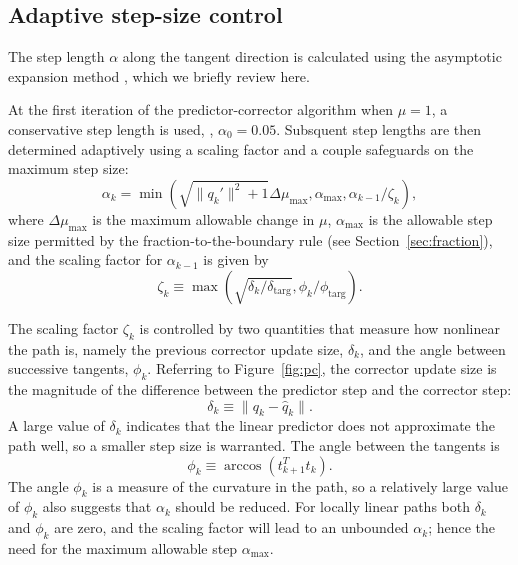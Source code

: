 \subsection{Adaptive step-size control}\label{sec:step}

The step length $\alpha$ along the tangent direction is calculated using the
asymptotic expansion method \cite{allgower3}, which we briefly review here.

At the first iteration of the predictor-corrector algorithm when $\mu=1$, a
conservative step length is used, \eg, $\alpha_0 = 0.05$.  Subsquent step
lengths are then determined adaptively using a scaling factor and a couple
safeguards on the maximum step size:
\begin{equation*}
  \alpha_{k} = \min\left( \sqrt{\|q_{k}'\|^2 + 1}\Delta \mu_{\max}, \alpha_{\max}, \alpha_{k-1}/\zeta_{k} \right),
\end{equation*}
where $\Delta \mu_{\max}$ is the maximum allowable change in $\mu$,
$\alpha_{\max}$ is the allowable step size permitted by the fraction-to-the-boundary
rule (see Section~\ref{sec:fraction}), and the scaling factor for $\alpha_{k-1}$ is given by
\begin{equation*}
  \zeta_{k} \equiv \max\left( \sqrt{\delta_k/\delta_{\text{targ}}}, \phi_k / \phi_{\text{targ}} \right).
\end{equation*}

The scaling factor $\zeta_k$ is controlled by two quantities that measure how
nonlinear the path is, namely the previous corrector update size, $\delta_k$, and the angle
between successive tangents, $\phi_k$.  Referring to Figure~\ref{fig:pc}, the corrector
update size is the magnitude of the difference between the predictor step and
the corrector step:
\begin{equation}\label{eq:delta_k}
  \delta_k \equiv \| q_{k} - \hat{q}_{k} \|.
\end{equation}
A large value of $\delta_k$ indicates that the linear predictor does not
approximate the path well, so a smaller step size is warranted.  The angle
between the tangents is
\begin{equation}\label{eq:phi_k}
  \phi_k \equiv \arccos\left(t_{k+1}^T t_{k} \right).
\end{equation}
The angle $\phi_k$ is a measure of the curvature in the path, so a relatively
large value of $\phi_k$ also suggests that $\alpha_k$ should be reduced.  For
locally linear paths both $\delta_k$ and $\phi_k$ are zero, and the scaling
factor will lead to an unbounded $\alpha_k$; hence the need for the maximum
allowable step $\alpha_{\max}$.

